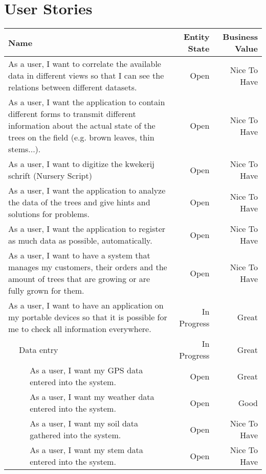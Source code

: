\section{User Stories}
	\renewcommand{\arraystretch}{2.6}
	\begin{longtable}{ l l l r r }
		\multicolumn{3}{p{8.5cm}}{\textbf{Name}} & \textbf{Entity State} & \textbf{Business Value} \\
		\hline
		\endhead
		\multicolumn{3}{p{8.5cm}}{As a user, I want to correlate the available data in different views so that I can see the relations between different datasets.} & Open & Nice To Have \\
		\multicolumn{3}{p{8.5cm}}{As a user, I want the application to contain different forms to transmit different information about the actual state of the trees on the field (e.g. brown leaves, thin stems...).	} & Open & Nice To Have \\
		\multicolumn{3}{p{8.5cm}}{As a user, I want to digitize the kwekerij schrift (Nursery Script)} & Open & Nice To Have \\
		\multicolumn{3}{p{8.5cm}}{As a user, I want the application to analyze the data of the trees and give hints and solutions for problems.} & Open & Nice To Have \\
		\multicolumn{3}{p{8.5cm}}{As a user, I want the application to register as much data as possible, automatically.} & Open & Nice To Have \\
		\multicolumn{3}{p{8.5cm}}{As a user, I want to have a system that manages my customers, their orders and the amount of trees that are growing or are fully grown for them.} & Open & Nice To Have \\
		\multicolumn{3}{p{8.5cm}}{As a user, I want to have an application on my portable devices so that it is possible for me to check all information everywhere.} & In Progress & Great \\
		 & \multicolumn{2}{l}{Data entry} & In Progress & Great \\
		 &  & \parbox{7.5cm}{As a user, I want my GPS data entered into the system.} & Open & Great \\
		 &  & \parbox{7.5cm}{As a user, I want my weather data entered into the system.} & Open & Good \\
		 &  & \parbox{7.5cm}{As a user, I want my soil data gathered into the system.} & Open & Nice To Have \\
		 &  & \parbox{7.5cm}{As a user, I want my stem data entered into the system.} & Open & Nice To Have \\

\end{longtable}
